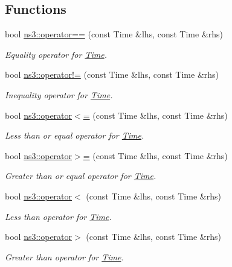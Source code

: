 \subsection*{Functions}
\begin{DoxyCompactItemize}
\item 
bool \hyperlink{group__time_ga9a8df4487438caae0c700440d0817881}{ns3\+::operator==} (const Time \&lhs, const Time \&rhs)
\begin{DoxyCompactList}\small\item\em Equality operator for \hyperlink{classns3_1_1Time}{Time}. \end{DoxyCompactList}\item 
bool \hyperlink{group__time_ga10b0f66bb239bafda5bda1cf83869646}{ns3\+::operator!=} (const Time \&lhs, const Time \&rhs)
\begin{DoxyCompactList}\small\item\em Inequality operator for \hyperlink{classns3_1_1Time}{Time}. \end{DoxyCompactList}\item 
bool \hyperlink{group__time_ga6b42d5764337bf20a6e871d20862a814}{ns3\+::operator$<$=} (const Time \&lhs, const Time \&rhs)
\begin{DoxyCompactList}\small\item\em Less than or equal operator for \hyperlink{classns3_1_1Time}{Time}. \end{DoxyCompactList}\item 
bool \hyperlink{group__time_gafd20c071438550ffb2c32fda9cb497e6}{ns3\+::operator$>$=} (const Time \&lhs, const Time \&rhs)
\begin{DoxyCompactList}\small\item\em Greater than or equal operator for \hyperlink{classns3_1_1Time}{Time}. \end{DoxyCompactList}\item 
bool \hyperlink{group__time_ga8ee6d389e81bc7b3c0799c2461626c45}{ns3\+::operator$<$} (const Time \&lhs, const Time \&rhs)
\begin{DoxyCompactList}\small\item\em Less than operator for \hyperlink{classns3_1_1Time}{Time}. \end{DoxyCompactList}\item 
bool \hyperlink{group__time_ga581ff7335f9907c2215986665955651f}{ns3\+::operator$>$} (const Time \&lhs, const Time \&rhs)
\begin{DoxyCompactList}\small\item\em Greater than operator for \hyperlink{classns3_1_1Time}{Time}. \end{DoxyCompactList}\item 

\end{DoxyCompactItemize}
